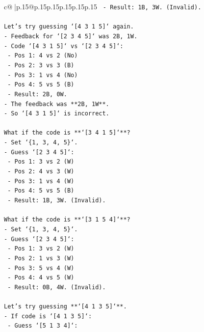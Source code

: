 \documentclass{article}
\begin{document}
{\begin{supertabular}{c@{$\;$}|p{.15\linewidth}@{}p{.15\linewidth}p{.15\linewidth}p{.15\linewidth}p{.15\linewidth}p{.15\linewidth}}
{{{\texttt{        {-} Result: 1B, 3W. (Invalid).} \\
\\ 
\texttt{Let's try guessing `{[}4 3 1 5{]}` again.} \\
\texttt{{-} Feedback for `{[}2 3 4 5{]}` was 2B, 1W.} \\
\texttt{{-} Code `{[}4 3 1 5{]}` vs `{[}2 3 4 5{]}`:} \\
\texttt{    {-} Pos 1: 4 vs 2 (No)} \\
\texttt{    {-} Pos 2: 3 vs 3 (B)} \\
\texttt{    {-} Pos 3: 1 vs 4 (No)} \\
\texttt{    {-} Pos 4: 5 vs 5 (B)} \\
\texttt{    {-} Result: 2B, 0W.} \\
\texttt{{-} The feedback was **2B, 1W**.} \\
\texttt{{-} So `{[}4 3 1 5{]}` is incorrect.} \\
\\ 
\texttt{What if the code is **`{[}3 4 1 5{]}`**?} \\
\texttt{{-} Set `\{1, 3, 4, 5\}`.} \\
\texttt{{-} Guess `{[}2 3 4 5{]}`:} \\
\texttt{    {-} Pos 1: 3 vs 2 (W)} \\
\texttt{    {-} Pos 2: 4 vs 3 (W)} \\
\texttt{    {-} Pos 3: 1 vs 4 (W)} \\
\texttt{    {-} Pos 4: 5 vs 5 (B)} \\
\texttt{    {-} Result: 1B, 3W. (Invalid).} \\
\\ 
\texttt{What if the code is **`{[}3 1 5 4{]}`**?} \\
\texttt{{-} Set `\{1, 3, 4, 5\}`.} \\
\texttt{{-} Guess `{[}2 3 4 5{]}`:} \\
\texttt{    {-} Pos 1: 3 vs 2 (W)} \\
\texttt{    {-} Pos 2: 1 vs 3 (W)} \\
\texttt{    {-} Pos 3: 5 vs 4 (W)} \\
\texttt{    {-} Pos 4: 4 vs 5 (W)} \\
\texttt{    {-} Result: 0B, 4W. (Invalid).} \\
\\ 
\texttt{Let's try guessing **`{[}4 1 3 5{]}`**.} \\
\texttt{{-} If code is `{[}4 1 3 5{]}`:} \\
\texttt{    {-} Guess `{[}5 1 3 4{]}`:} \\
}}}
\end{supertabular}}
\end{document}
